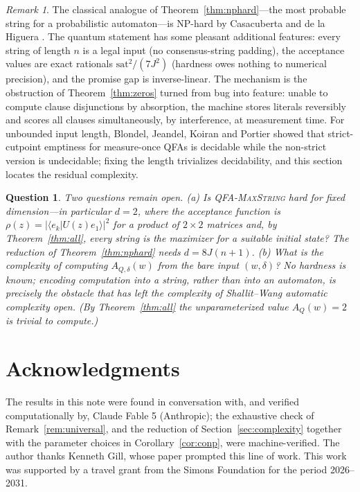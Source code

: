 \documentclass[11pt]{amsart}
\newtheorem{question}[theorem]{Question}
\theoremstyle{definition}
\theoremstyle{remark}
\newtheorem{remark}[theorem]{Remark}
\newcommand{\AQ}{A_Q}
\begin{document}
\begin{remark}\label{rem:lit}
The classical analogue of Theorem~\ref{thm:nphard}---the most
probable string for a probabilistic automaton---is NP-hard by
Casacuberta and de la Higuera \cite{CH00}. The quantum statement has
some pleasant additional features: every string of length $n$ is a
legal input (no consensus-string padding), the acceptance values are
exact rationals $\mathrm{sat}^2/(7J^2)$ (hardness owes nothing to
numerical precision), and the promise gap is inverse-linear. The
mechanism is the obstruction of Theorem~\ref{thm:zeros} turned from
bug into feature: unable to compute clause disjunctions by
absorption, the machine stores literals reversibly and scores all
clauses simultaneously, by interference, at measurement time. For
unbounded input length, Blondel, Jeandel, Koiran and Portier
\cite{BJKP05} showed that strict-cutpoint emptiness for measure-once
QFAs is decidable while the non-strict version is undecidable;
fixing the length trivializes decidability, and this section locates
the residual complexity.
\end{remark}

\begin{question}\label{q:complexity}
Two questions remain open. (a) Is \textup{\textsc{QFA-MaxString}} hard for
\emph{fixed} dimension---in particular $d=2$, where the acceptance
function is $\rho(z)=|\langle e_k|U(z)e_1\rangle|^2$ for a product of
$2\times2$ matrices and, by Theorem~\ref{thm:all}, every string is
the maximizer for a suitable initial state? The reduction of
Theorem~\ref{thm:nphard} needs $d=8J(n+1)$. (b) What is the
complexity of computing $A_{Q,\delta}(w)$ from the bare input
$(w,\delta)$? No hardness is known; encoding computation into a
\emph{string}, rather than into an automaton, is precisely the
obstacle that has left the complexity of Shallit--Wang automatic
complexity \cite{SW01} open. (By Theorem~\ref{thm:all} the
unparameterized value $\AQ(w)=2$ is trivial to compute.)
\end{question}

\section*{Acknowledgments}

The results in this note were found in conversation with, and verified
computationally by, Claude Fable 5 (Anthropic); the exhaustive check
of Remark~\ref{rem:universal}, and the reduction of
Section~\ref{sec:complexity} together with the parameter choices in
Corollary~\ref{cor:conp}, were machine-verified. The author thanks Kenneth Gill, whose paper \cite{Gill24}
prompted this line of work. This work was supported by a travel grant
from the Simons Foundation for the period 2026--2031.
\end{document}

